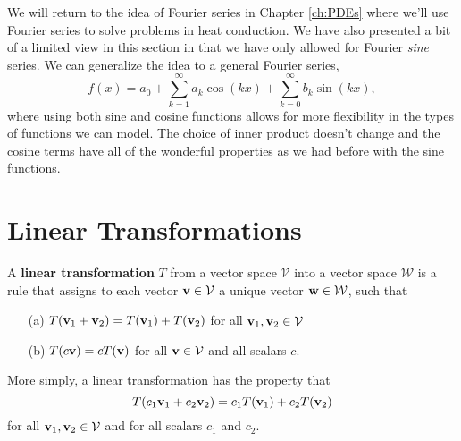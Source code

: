 We will return to the idea of Fourier series in Chapter \ref{ch:PDEs} where we'll use Fourier series to
solve problems in heat conduction. We have also presented a bit of a
limited view in this section in that we have only allowed for Fourier {\it sine} series.
We can generalize the idea to a general Fourier series,
\[ f(x) = a_0 + \sum_{k=1}^\infty a_k \cos(kx) + \sum_{k=0}^\infty b_k \sin(kx), \]
where using both sine and cosine functions allows for more flexibility in the types of
functions we can model.  The choice of inner product doesn't change and the cosine terms
have all of the wonderful properties as we had before with the sine functions.  

% 
%     
% 
% 
% 


\newpage\section{Linear Transformations}
\begin{definition}
    A {\bf linear transformation} $T$ from a vector space $\mathcal{V}$ into a vector
    space $\mathcal{W}$ is a rule that assigns to each vector ${\bf v} \in \mathcal{V}$ a
    unique vector ${\bf w} \in \mathcal{W}$, such that
    \begin{enumerate}
        \item[(a)] $T({\bf v}_1 + {\bf v}_2) = T({\bf v}_1) + T({\bf v}_2)$ for all ${\bf v}_1, {\bf v}_2 \in \mathcal{V}$
        \item[(b)] $T(c{\bf v}) = c T({\bf v})$ for all ${\bf v} \in \mathcal{V}$ and all scalars
            $c$.
    \end{enumerate}
    More simply, a linear transformation has the property that
    \[ T(c_1 {\bf v}_1 + c_2 {\bf v}_2) = c_1 T({\bf v}_1) + c_2 T({\bf v}_2) \]
    for all ${\bf v}_1 ,{\bf v}_2 \in \mathcal{V}$ and for all scalars $c_1$ and $c_2$.
\end{definition}


